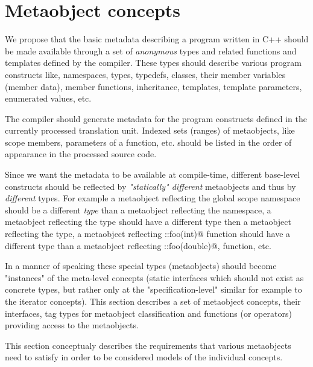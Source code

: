 \section{Metaobject concepts}

We propose that the basic metadata describing a program written
in C++ should be made available through a set of {\em anonymous} types
and related functions and templates
defined by the compiler. These types should describe various program
constructs like, namespaces, types, typedefs, classes, their member variables
(member data), member functions, inheritance, templates, template parameters,
enumerated values, etc.

The compiler should generate metadata for the program constructs defined
in the currently processed translation unit. Indexed sets (ranges) of metaobjects,
like scope members, parameters of a function, etc. should be listed
in the order of appearance in the processed source code.

Since we want the metadata to be available at compile-time,
different base-level constructs should be reflected by
{\em "statically" different} metaobjects and thus by {\em different} types.
For example a metaobject reflecting the global scope namespace should
be a different {\em type} than a metaobject reflecting the \verb@std@
namespace, a metaobject reflecting the \verb@int@ type should
have a different type then a metaobject reflecting the \verb@double@
type, a metaobject reflecting \verb@::foo(int)@ function should
have a different type than a metaobject reflecting \verb@::foo(double)@,
function, etc.

In a manner of speaking these special types (metaobjects) should become
"instances" of the meta-level concepts (static interfaces which
should not exist as concrete types, but rather only at the
"specification-level" similar for example to the iterator concepts).
This section describes a set of metaobject concepts,
their interfaces, tag types for metaobject classification and
functions (or operators) providing access to the metaobjects.

This section conceptualy describes the requirements that various metaobjects
need to satisfy in order to be considered models of the individual
concepts.







